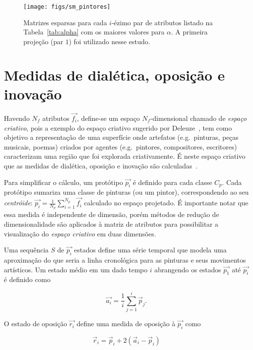 \begin{figure}[h!]
\begin{center}
{    \centering
        \texttt{[image: figs/sm\_pintores]}}
      \caption{Matrizes esparsas para cada $i$-ézimo par de atributos listado na
        Tabela~\ref{tab:alpha} com os maiores valores para $\alpha$. A primeira
        projeção (par $1$) foi utilizado nesse estudo.}
        \label{fig:scatters}
        \end{center}
\end{figure}

\section{Medidas de dialética, oposição e inovação}
\label{sec:medidas}

Havendo $N_f$ atributos $\vec{f_i}$, define-se um espaço
$N_f$-dimensional chamado de \textit{espaço criativo}, pois a exemplo
do espaço criativo sugerido por Deleuze~\cite{deleuze}, tem como
objetivo a representação de uma superfície onde artefatos
(e.g.\ pinturas, peças musicais, poemas) criados por agentes
(e.g.\ pintores, compositores, escritores) caracterizam uma região que
foi explorada criativamente. É neste espaço criativo que as medidas de
dialética, oposição e inovação são calculadas~\cite{vieira}.

Para simplificar o cálculo, um protótipo $\vec{p_i}$ é definido para cada classe
$C_p$. Cada protótipo sumariza uma classe de pinturas (ou um pintor),
correspondendo ao seu \textit{centróide}: $\vec{p_i} = \frac{1}{N_p}
\sum_{i=1}^{N_p} \vec{f_i}$ calculado no espaço projetado. É importante notar
que essa medida é independente de dimensão, porém métodos de redução de
dimensionalidade são aplicados à matriz de atributos para possibilitar a
visualização do \textit{espaço criativo} em duas dimensões.

Uma sequência $S$ de $\vec{p_i}$ estados define uma série temporal que
modela uma aproximação do que seria a linha cronológica para as
pinturas e seus movimentos artísticos. Um estado médio em um dado
tempo $i$ abrangendo os estados $\vec{p_1}$ até $\vec{p_i}$ é definido
como

\begin{equation}
\vec{a_i} = \frac{1}{i}\sum_{j=1}^i\vec{p}_j.
\end{equation}

O estado de oposição $\vec{r_i}$ define uma medida de oposição à $\vec{p_i}$ como

\begin{equation}
\vec{r}_i = \vec{p}_i + 2(\vec{a}_i - \vec{p}_i)
\end{equation}

